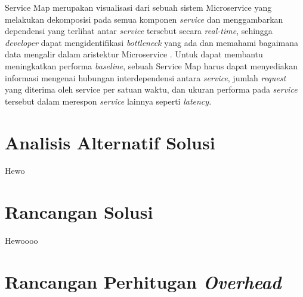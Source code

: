 Service Map merupakan visualisasi dari sebuah sistem Microservice yang melakukan dekomposisi pada semua komponen \textit{service} dan menggambarkan dependensi yang terlihat antar \textit{service} tersebut secara \textit{real-time}, sehingga \textit{developer} dapat mengidentifikasi \textit{bottleneck} yang ada dan memahami bagaimana data mengalir dalam aristektur Microservice \citep{datadog-svcmap}. Untuk dapat membantu meningkatkan performa \textit{baseline}, sebuah Service Map harus dapat menyediakan informasi mengenai hubungan interdependensi antara \textit{service}, jumlah \textit{request} yang diterima oleh service per satuan waktu, dan ukuran performa pada \textit{service} tersebut dalam merespon \textit{service} lainnya seperti \textit{latency}.







%



\section{Analisis Alternatif Solusi}
Hewo

\section{Rancangan Solusi}

Hewoooo
\section{Rancangan Perhitugan \textit{Overhead}}


